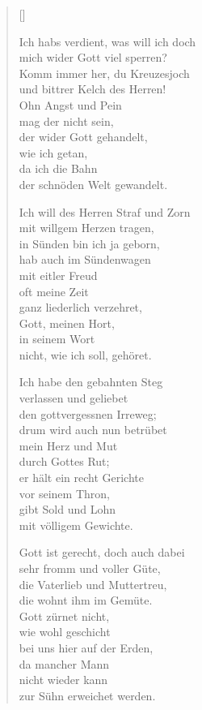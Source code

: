 \begin{multicols}{2}
\settowidth{\versewidth}{Ich habs verdient, was will ich doch}
\begin{verse}[\versewidth]

 Ich habs verdient, was will ich doch\\
mich wider Gott viel sperren?\\
Komm immer her, du Kreuzesjoch\\
und bittrer Kelch des Herren!\\
Ohn Angst und Pein\\
mag der nicht sein,\\
der wider Gott gehandelt,\\
wie ich getan,\\
da ich die Bahn\\
der schnöden Welt gewandelt.

 Ich will des Herren Straf und Zorn\\
mit willgem Herzen tragen,\\
in Sünden bin ich ja geborn,\\
hab auch im Sündenwagen\\
mit eitler Freud\\
oft meine Zeit\\
ganz liederlich verzehret,\\
Gott, meinen Hort,\\
in seinem Wort\\
nicht, wie ich soll, gehöret.

 Ich habe den gebahnten Steg\\
verlassen und geliebet\\
den gottvergessnen Irreweg;\\
drum wird auch nun betrübet\\
mein Herz und Mut\\
durch Gottes Rut;\\
er hält ein recht Gerichte\\
vor seinem Thron,\\
gibt Sold und Lohn\\
mit völligem Gewichte.

 Gott ist gerecht, doch auch dabei\\
sehr fromm und voller Güte,\\
die Vaterlieb und Muttertreu,\\
die wohnt ihm im Gemüte.\\
Gott zürnet nicht,\\
wie wohl geschicht\\
bei uns hier auf der Erden,\\
da mancher Mann\\
nicht wieder kann\\
zur Sühn erweichet werden.


\end{verse}
\end{multicols}

